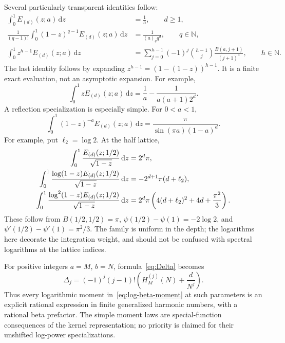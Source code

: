 \documentclass[11pt,oneside]{article}
\numberwithin{equation}{section}
\theoremstyle{definition}
\theoremstyle{remark}
\newcommand{\dd}{\,\mathrm d}
\newcommand{\N}{\mathbb N}
\begin{document}
Several particularly transparent identities follow:
\begin{align}
\int_0^1 E_{(d)}(z;a)\dd z&=\frac1a,\qquad d\ge1,\label{eq:moment-simple}\\
\frac1{(q-1)!}\int_0^1(1-z)^{q-1}E_{(d)}(z;a)\dd z
 &=\frac1{(a)_q q^d},\qquad q\in\N,\label{eq:qordinary}\\
\int_0^1 z^{h-1}E_{(d)}(z;a)\dd z
 &=\sum_{j=0}^{h-1}(-1)^j\binom{h-1}{j}
                   \frac{B(a,j+1)}{(j+1)^d},\qquad h\in\N.
\label{eq:positive-moments}
\end{align}
The last identity follows by expanding $z^{h-1}=(1-(1-z))^{h-1}$.
It is a finite exact evaluation, not an asymptotic expansion. For example,
\[
\int_0^1zE_{(d)}(z;a)\dd z
=\frac1a-\frac1{a(a+1)2^d}.
\]
A reflection specialization is especially simple. For $0<a<1$,
\begin{equation}\label{eq:reflection-moment}
\int_0^1(1-z)^{-a}E_{(d)}(z;a)\dd z
=\frac{\pi}{\sin(\pi a)(1-a)^d}.
\end{equation}
For example, put $\ell_2=\log2$. At the half lattice,
\begin{align}
\int_0^1\frac{E_{(d)}(z;1/2)}{\sqrt{1-z}}\dd z
 &=2^d\pi,\notag\\
\int_0^1\frac{\log(1-z)E_{(d)}(z;1/2)}{\sqrt{1-z}}\dd z
 &=-2^{d+1}\pi(d+\ell_2),\label{eq:half-moments}\\
\int_0^1\frac{\log^2(1-z)E_{(d)}(z;1/2)}{\sqrt{1-z}}\dd z
 &=2^d\pi\left(4(d+\ell_2)^2+4d+\frac{\pi^2}{3}\right).\notag
\end{align}
These follow from $B(1/2,1/2)=\pi$,
$\psi(1/2)-\psi(1)=-2\log2$, and
$\psi'(1/2)-\psi'(1)=\pi^2/3$. The family is uniform in the depth; the
logarithms here decorate the integration weight, and should not be confused
with spectral logarithms at the lattice indices.

For positive integers $a=M$, $b=N$, formula~\eqref{eq:Delta} becomes
\begin{equation}\label{eq:Delta-harmonic}
\Delta_j=(-1)^j(j-1)!
 \left(H_M^{(j)}(N)+\frac d{N^j}\right).
\end{equation}
Thus every logarithmic moment in~\eqref{eq:log-beta-moment} at such parameters
is an explicit rational expression in finite generalized harmonic numbers,
with a rational beta prefactor. The simple moment laws are special-function
consequences of the kernel representation; no priority is claimed for their
unshifted log-power specializations.
\end{document}
